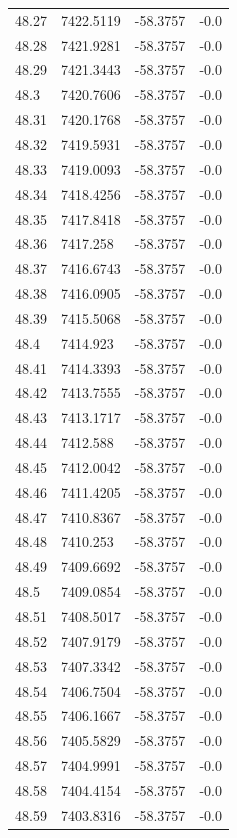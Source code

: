 \begin{table}[H]
\begin{tabular}{llll}
48.27 & 7422.5119 & -58.3757 & -0.0 \\
48.28 & 7421.9281 & -58.3757 & -0.0 \\
48.29 & 7421.3443 & -58.3757 & -0.0 \\
48.3 & 7420.7606 & -58.3757 & -0.0 \\
48.31 & 7420.1768 & -58.3757 & -0.0 \\
48.32 & 7419.5931 & -58.3757 & -0.0 \\
48.33 & 7419.0093 & -58.3757 & -0.0 \\
48.34 & 7418.4256 & -58.3757 & -0.0 \\
48.35 & 7417.8418 & -58.3757 & -0.0 \\
48.36 & 7417.258 & -58.3757 & -0.0 \\
48.37 & 7416.6743 & -58.3757 & -0.0 \\
48.38 & 7416.0905 & -58.3757 & -0.0 \\
48.39 & 7415.5068 & -58.3757 & -0.0 \\
48.4 & 7414.923 & -58.3757 & -0.0 \\
48.41 & 7414.3393 & -58.3757 & -0.0 \\
48.42 & 7413.7555 & -58.3757 & -0.0 \\
48.43 & 7413.1717 & -58.3757 & -0.0 \\
48.44 & 7412.588 & -58.3757 & -0.0 \\
48.45 & 7412.0042 & -58.3757 & -0.0 \\
48.46 & 7411.4205 & -58.3757 & -0.0 \\
48.47 & 7410.8367 & -58.3757 & -0.0 \\
48.48 & 7410.253 & -58.3757 & -0.0 \\
48.49 & 7409.6692 & -58.3757 & -0.0 \\
48.5 & 7409.0854 & -58.3757 & -0.0 \\
48.51 & 7408.5017 & -58.3757 & -0.0 \\
48.52 & 7407.9179 & -58.3757 & -0.0 \\
48.53 & 7407.3342 & -58.3757 & -0.0 \\
48.54 & 7406.7504 & -58.3757 & -0.0 \\
48.55 & 7406.1667 & -58.3757 & -0.0 \\
48.56 & 7405.5829 & -58.3757 & -0.0 \\
48.57 & 7404.9991 & -58.3757 & -0.0 \\
48.58 & 7404.4154 & -58.3757 & -0.0 \\
48.59 & 7403.8316 & -58.3757 & -0.0 \\

\end{tabular}
\end{table}
